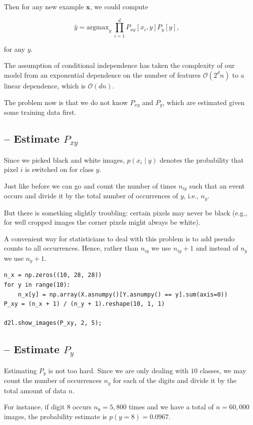 Then for any new example $\mathbf x$, we could compute

$$ \hat{y} = \mathrm{argmax}_y \> \prod_{i=1}^d P_{xy}[x_i, y]P_y[y],$$

for any $y$.


The assumption of conditional independence has taken the complexity of our model
from an exponential dependence on the number of features $\mathcal{O}(2^dn)$ to
a linear dependence, which is $\mathcal{O}(dn)$.

The problem now is that we do not know $P_{xy}$ and $P_y$, which are estimated given some training data first.


\subsection{-- Estimate $P_{xy}$}


Since we picked black and white images, $p(x_i  \mid  y)$ denotes the
probability that pixel $i$ is switched on for class $y$. 

Just like before we can go and count the number of times $n_{iy}$ such that an
event occurs and divide it by the total number of occurrences of $y$, i.e.,
$n_y$. 

But there is something slightly troubling: certain pixels may never be
black (e.g., for well cropped images the corner pixels might always be white).

A convenient way for statisticians to deal with this problem is to add pseudo
counts to all occurrences. Hence, rather than $n_{iy}$ we use $n_{iy}+1$ and
instead of $n_y$ we use $n_{y} + 1$.

\begin{lstlisting}
n_x = np.zeros((10, 28, 28))
for y in range(10):
    n_x[y] = np.array(X.asnumpy()[Y.asnumpy() == y].sum(axis=0))
P_xy = (n_x + 1) / (n_y + 1).reshape(10, 1, 1)

d2l.show_images(P_xy, 2, 5);
\end{lstlisting}


\subsection{-- Estimate $P_y$}

Estimating $P_y$ is not too hard. Since we are only dealing with $10$ classes,
we may count the number of occurrences $n_y$ for each of the digits and divide
it by the total amount of data $n$.

For instance, if digit 8 occurs $n_8 = 5,800$ times and we have a total of 
$n = 60,000$ images, the probability estimate is $p(y=8) = 0.0967$.


